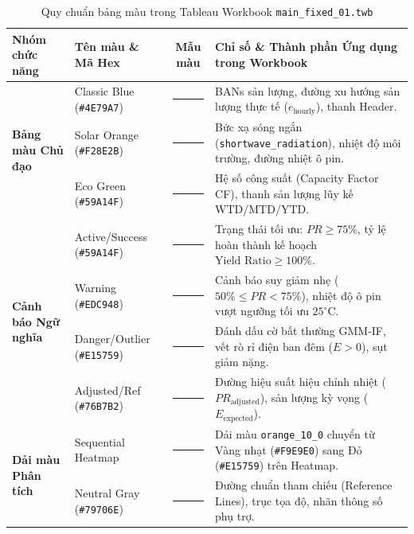 \documentclass[12pt, a4paper]{report}
\begin{document}
\begin{table}[H]
\centering
\caption{Quy chuẩn bảng màu trong Tableau Workbook \texttt{main\_fixed\_01.twb}}
\label{tab:tableau_color_system}
\small
\renewcommand{\arraystretch}{1.3}
\begin{tabularx}{\textwidth}{@{} l l c X @{}}
\toprule
\textbf{Nhóm chức năng} & \textbf{Tên màu \& Mã Hex} & \textbf{Mẫu màu} & \textbf{Chỉ số \& Thành phần Ứng dụng trong Workbook} \\
\midrule
\multirow{3}{*}{\textbf{Bảng màu Chủ đạo}} 
& Classic Blue (\texttt{\#4E79A7}) & \textcolor{tblNavy}{\rule{1.2cm}{0.3cm}} & BANs sản lượng, đường xu hướng sản lượng thực tế ($e_{\text{hourly}}$), thanh Header. \\
& Solar Orange (\texttt{\#F28E2B}) & \textcolor{tblOrange}{\rule{1.2cm}{0.3cm}} & Bức xạ sóng ngắn (\texttt{shortwave\_radiation}), nhiệt độ môi trường, đường nhiệt ô pin. \\
& Eco Green (\texttt{\#59A14F}) & \textcolor{tblGreen}{\rule{1.2cm}{0.3cm}} & Hệ số công suất (Capacity Factor CF), thanh sản lượng lũy kế WTD/MTD/YTD. \\
\midrule
\multirow{4}{*}{\textbf{Cảnh báo Ngữ nghĩa}}
& Active/Success (\texttt{\#59A14F}) & \textcolor{tblGreen}{\rule{1.2cm}{0.3cm}} & Trạng thái tối ưu: $PR \ge 75\%$, tỷ lệ hoàn thành kế hoạch $\text{Yield Ratio} \ge 100\%$. \\
& Warning (\texttt{\#EDC948}) & \textcolor{tblYellow}{\rule{1.2cm}{0.3cm}} & Cảnh báo suy giảm nhẹ ($50\% \le PR < 75\%$), nhiệt độ ô pin vượt ngưỡng tối ưu $25^\circ\text{C}$. \\
& Danger/Outlier (\texttt{\#E15759}) & \textcolor{tblRed}{\rule{1.2cm}{0.3cm}} & Đánh dấu cờ bất thường GMM-IF, vết rò rỉ điện ban đêm ($E > 0$), sụt giảm nặng. \\
& Adjusted/Ref (\texttt{\#76B7B2}) & \textcolor{tblTeal}{\rule{1.2cm}{0.3cm}} & Đường hiệu suất hiệu chỉnh nhiệt ($PR_{\text{adjusted}}$), sản lượng kỳ vọng ($E_{\text{expected}}$). \\
\midrule
\multirow{2}{*}{\textbf{Dải màu Phân tích}}
& Sequential Heatmap & \textcolor{tblSeqWarm}{\rule{1.2cm}{0.3cm}} & Dải màu \texttt{orange\_10\_0} chuyển từ Vàng nhạt (\texttt{\#F9E9E0}) sang Đỏ (\texttt{\#E15759}) trên Heatmap. \\
& Neutral Gray (\texttt{\#79706E}) & \textcolor{tblGray}{\rule{1.2cm}{0.3cm}} & Đường chuẩn tham chiếu (Reference Lines), trục tọa độ, nhãn thông số phụ trợ. \\
\bottomrule
\end{tabularx}


\end{table}
\end{document}
